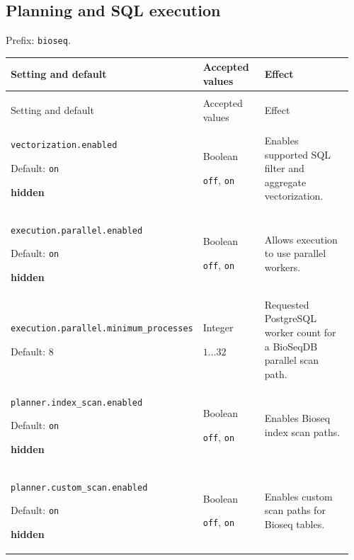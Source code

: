 \subsection{Planning and SQL execution}

Prefix: \nolinkurl{bioseq}.

\begingroup
\small
\setlength{\tabcolsep}{4pt}
\renewcommand{\arraystretch}{1.16}
\begin{longtable}{@{}>{\raggedright\arraybackslash}p{0.34\linewidth}>{\raggedright\arraybackslash}p{0.22\linewidth}>{\raggedright\arraybackslash}p{0.40\linewidth}@{}}
\toprule
Setting and default & Accepted values & Effect \\
\midrule
\endfirsthead
\multicolumn{3}{@{}l}{Prefix: \nolinkurl{bioseq} (continued)} \\
\toprule
Setting and default & Accepted values & Effect \\
\midrule
\endhead
\bottomrule
\endfoot
\nolinkurl{vectorization.enabled}\par Default: \texttt{on}\par \textbf{hidden} & Boolean\par \texttt{off}, \texttt{on} & Enables supported SQL filter and aggregate vectorization. \\[4pt]
\nolinkurl{execution.parallel.enabled}\par Default: \texttt{on}\par \textbf{hidden} & Boolean\par \texttt{off}, \texttt{on} & Allows execution to use parallel workers. \\[4pt]
\nolinkurl{execution.parallel.minimum_processes}\par Default: 8 & Integer\par $1\ldots 32$ & Requested PostgreSQL worker count for a BioSeqDB parallel scan path. \\[4pt]
\nolinkurl{planner.index_scan.enabled}\par Default: \texttt{on}\par \textbf{hidden} & Boolean\par \texttt{off}, \texttt{on} & Enables Bioseq index scan paths. \\[4pt]
\nolinkurl{planner.custom_scan.enabled}\par Default: \texttt{on}\par \textbf{hidden} & Boolean\par \texttt{off}, \texttt{on} & Enables custom scan paths for Bioseq tables. \\[4pt]

\end{longtable}
